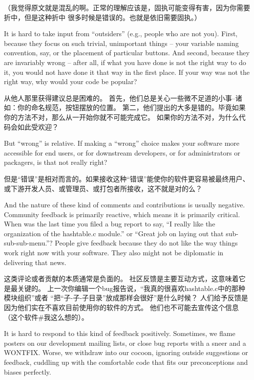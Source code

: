 （我觉得原文就是混乱的啊。正常的理解应该是，固执可能变得有害，因为你需要折中，但是这种折中
很多时候是错误的。也就是依旧需要固执。）

It is hard to take input from ``outsiders'' (e.g., people who are not you). First, because they focus on such trivial, unimportant things -- your variable naming convention, say, or the placement of particular buttons. And second, because they are invariably wrong -- after all, if what you have done is not the right way to do it, you would not have done it that way in the first place. If your way was not the right way, why would your code be popular?

从他人那里获得建议总是困难的。
首先，他们总是关心一些微不足道的小事--诸如：你的命名规范，按钮摆放的位置。
第二，他们提出的大多是错的。毕竟如果你的方法不对，那么从一开始你就不可能完成它。
如果你的方法不对，为什么代码会如此受欢迎？

But ``wrong'' is relative. If making a ``wrong'' choice makes your software more
accessible for end users, or for downstream developers, or for administrators or
packagers, is that not really right?

但是``错误''是相对而言的。如果接收这种``错误''能使你的软件更容易被最终用户、
或下游开发人员、或管理员、或打包者所接收，这不就是对的么？

And the nature of these kind of comments and contributions is usually negative.
Community feedback is primarily reactive, which means it is primarily critical.
When was the last time you filed a bug report to say, ``I really like the
organization of the hashtable.c module.'' or ``Great job on laying out that
sub-sub-sub-menu.''? People give feedback because they do not like the way things work right now with your software. They also might not be diplomatic in
delivering that news.

这类评论或者贡献的本质通常是负面的。
社区反馈是主要互动方式，这意味着它是最关键的。
上一次你编辑一个bug报告说，``我真的很喜欢hashtable.c中的那种模块组织''或者
``把“子-子-子目录”放成那样会很好''是什么时候？
人们给予反馈是因为他们实在不喜欢目前使用你的软件的方式。
他们也不可能去宣传这个信息（这个软件#我这么想的）。

It is hard to respond to this kind of feedback positively. Sometimes, we flame
posters on our development mailing lists, or close bug reports with a sneer and
a WONTFIX. Worse, we withdraw into our cocoon, ignoring outside suggestions or
feedback, cuddling up with the comfortable code that fits our preconceptions and
biases perfectly.

